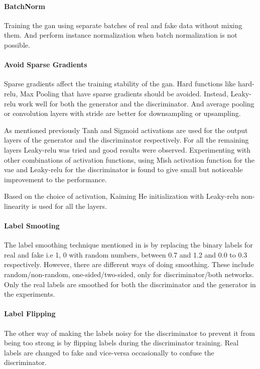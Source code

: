 \paragraph{BatchNorm}
Training the \ac{gan} using separate batches of real and fake data without mixing them. And perform instance normalization when batch normalization is not possible.

\paragraph{Avoid Sparse Gradients}
Sparse gradients affect the training stability of the \ac{gan}. Hard functions like hard- \ac{relu}, Max Pooling that have sparse gradients should be avoided. Instead, Leaky-\ac{relu} work well for both the generator and the discriminator. And average pooling or convolution layers with stride are better for downsampling or upsampling.

As mentioned previously Tanh and Sigmoid activations are used for the output layers of the generator and the discriminator respectively. For all the remaining layers Leaky-\ac{relu} was tried and good results were observed. Experimenting with other combinations of activation functions, using Mish activation function \cite{mish} for the \ac{vae} and Leaky-\ac{relu} for the discriminator is found to give small but noticeable improvement to the performance.

Based on the choice of activation, Kaiming He initialization with Leaky-\ac{relu} non-linearity is used for all the layers.

\paragraph{Label Smooting}
The label smoothing technique mentioned in \cite{gan_hacks} is by replacing the binary labels for real and fake i.e 1, 0 with random numbers, between 0.7 and 1.2 and 0.0 to 0.3 respectively. However, there are different ways of doing smoothing. These include random/non-random, one-sided/two-sided, only for discriminator/both networks. Only the real labels are smoothed for both the discriminator and the generator in the experiments. 

\paragraph{Label Flipping}
The other way of making the labels noisy for the discriminator to prevent it from being too strong is by flipping labels during the discriminator training. Real labels are changed to fake and vice-versa occasionally to confuse the discriminator. 

